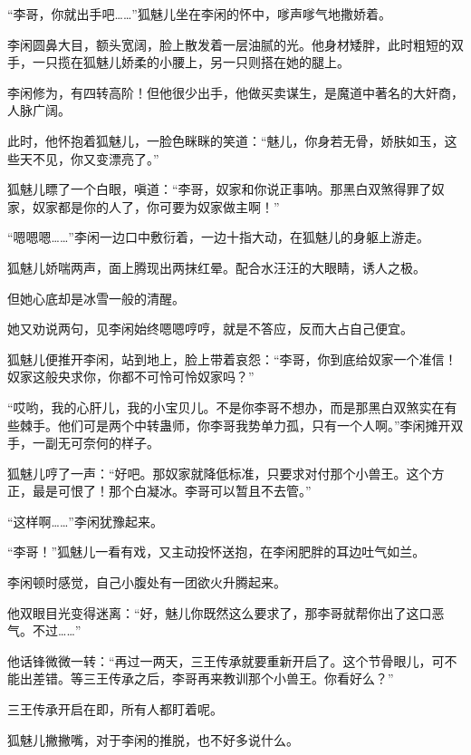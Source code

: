 
\begin{this_body}



“李哥，你就出手吧……”狐魅儿坐在李闲的怀中，嗲声嗲气地撒娇着。

李闲圆鼻大目，额头宽阔，脸上散发着一层油腻的光。他身材矮胖，此时粗短的双手，一只揽在狐魅儿娇柔的小腰上，另一只则搭在她的腿上。

李闲修为，有四转高阶！但他很少出手，他做买卖谋生，是魔道中著名的大奸商，人脉广阔。

此时，他怀抱着狐魅儿，一脸色眯眯的笑道：“魅儿，你身若无骨，娇肤如玉，这些天不见，你又变漂亮了。”

狐魅儿瞟了一个白眼，嗔道：“李哥，奴家和你说正事呐。那黑白双煞得罪了奴家，奴家都是你的人了，你可要为奴家做主啊！”

“嗯嗯嗯……”李闲一边口中敷衍着，一边十指大动，在狐魅儿的身躯上游走。

狐魅儿娇喘两声，面上腾现出两抹红晕。配合水汪汪的大眼睛，诱人之极。

但她心底却是冰雪一般的清醒。

她又劝说两句，见李闲始终嗯嗯哼哼，就是不答应，反而大占自己便宜。

狐魅儿便推开李闲，站到地上，脸上带着哀怨：“李哥，你到底给奴家一个准信！奴家这般央求你，你都不可怜可怜奴家吗？”

“哎哟，我的心肝儿，我的小宝贝儿。不是你李哥不想办，而是那黑白双煞实在有些棘手。他们可是两个中转蛊师，你李哥我势单力孤，只有一个人啊。”李闲摊开双手，一副无可奈何的样子。

狐魅儿哼了一声：“好吧。那奴家就降低标准，只要求对付那个小兽王。这个方正，最是可恨了！那个白凝冰。李哥可以暂且不去管。”

“这样啊……”李闲犹豫起来。

“李哥！”狐魅儿一看有戏，又主动投怀送抱，在李闲肥胖的耳边吐气如兰。

李闲顿时感觉，自己小腹处有一团欲火升腾起来。

他双眼目光变得迷离：“好，魅儿你既然这么要求了，那李哥就帮你出了这口恶气。不过……”

他话锋微微一转：“再过一两天，三王传承就要重新开启了。这个节骨眼儿，可不能出差错。等三王传承之后，李哥再来教训那个小兽王。你看好么？”

三王传承开启在即，所有人都盯着呢。

狐魅儿撇撇嘴，对于李闲的推脱，也不好多说什么。


\end{this_body}
